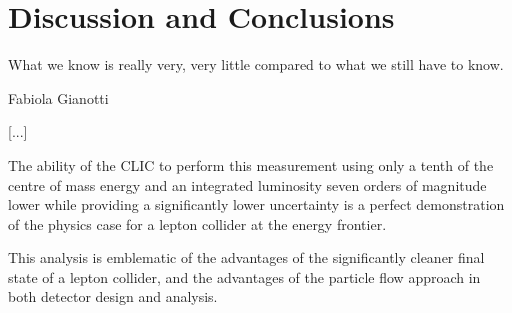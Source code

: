 \chapter{Discussion and Conclusions}
\label{chapter:discussion}

\epigraph{What we know is really very, very little compared to what we still have to know.}{Fabiola Gianotti}




[...]

The ability of the \acrlong{CLIC} to perform this measurement using only a tenth of the centre of mass energy and an integrated luminosity seven orders of magnitude lower while providing a significantly lower uncertainty is a perfect demonstration of the physics case for a lepton collider at the energy frontier.

This analysis is emblematic of the advantages of the significantly cleaner final state of a lepton collider, and the advantages of the particle flow approach in both detector design and analysis.